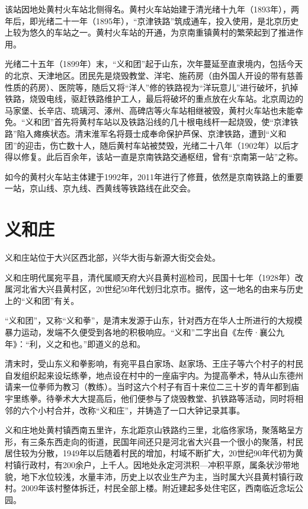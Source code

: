 该站因地处黄村火车站北侧得名。黄村火车站始建于清光绪十九年（1893年），两年后，即光绪二十一年（1895年），“京津铁路”筑成通车，投入使用，是北京历史上较为悠久的车站之一。黄村火车站的开通，为京南重镇黄村的繁荣起到了推进作用。

光绪二十五年（1899年）末，“义和团”起于山东，次年蔓延至直隶境内，包括今天的北京、天津地区。团民先是烧毁教堂、洋宅、施药房（由外国人开设的带有慈善性质的药房）、医院等，随后又将“洋人”修的铁路视为“洋玩意儿”进行破坏，扒掉铁路，烧毁电线，驱赶铁路维护工人，最后将破坏的重点放在火车站。北京周边的马家堡、长辛店、琉璃河、涿州、高碑店等火车站相继被毁，黄村火车站也未能幸免。“义和团”首先将黄村车站以及铁路沿线的几十根电线杆一起烧毁，使“京津铁路”陷入瘫痪状态。清末淮军名将聂士成奉命保护芦保、京津铁路，遭到“义和团”的迎击，伤亡数十人，随后黄村车站被焚毁，光绪二十八年（1902年）以后才得以修复。此后百余年，该站一直是京南铁路交通枢纽，曾有“京南第一站”之称。

如今的黄村火车站主体建于1992年，2011年进行了修葺，依然是京南铁路上的重要一站，京山线、京九线、西黄线等铁路线在此交会。

\section{义和庄}
义和庄站位于大兴区西北部，兴华大街与新源大街交会处。

义和庄明代属宛平县，清代属顺天府大兴县黄村巡检司，民国十七年（1928年）改属河北省大兴县黄村区，20世纪50年代划归北京市。据传，这一地名的由来与历史上的“义和团”有关。

“义和团”，又称“义和拳”，是清末发源于山东，针对西方在华人士所进行的大规模暴力运动，发端不久便受到各地的积极响应。“义和”二字出自《左传·襄公九年》：“利，义之和也。”即道义的总和。

清末时，受山东义和拳影响，有宛平县白家场、赵家场、王庄子等六个村子的村民自发组织起来设坛练拳，地点设在村中的一座庙宇内。为提高拳术，特从山东德州请来一位拳师为教习（教练）。当时这六个村子有百十来位二三十岁的青年都到庙宇里练拳。待拳术大大提高后，他们便参与了烧毁教堂、扒铁路等活动，同时将相邻的六个小村合并，改称“义和庄”，并铸造了一口大钟记录其事。

义和庄地处黄村镇西南五里许，东北距京山铁路约三里，北临佟家场，聚落略呈方形，有三条东西走向的街道，民国年间还只是河北省大兴县一个很小的聚落，村民居住较为分散，1949年以后随着村民的增加，村域不断扩大，20世纪90年代初为黄村镇行政村，有200余户，上千人。因地处永定河洪积—冲积平原，属条状沙带地貌，地下水位较浅，水量丰沛，历史上以农业生产为主，当时属大兴县黄村镇行政村。2009年该村整体拆迁，村民全部上楼。附近建起多处住宅区，西南临近念坛公园。

